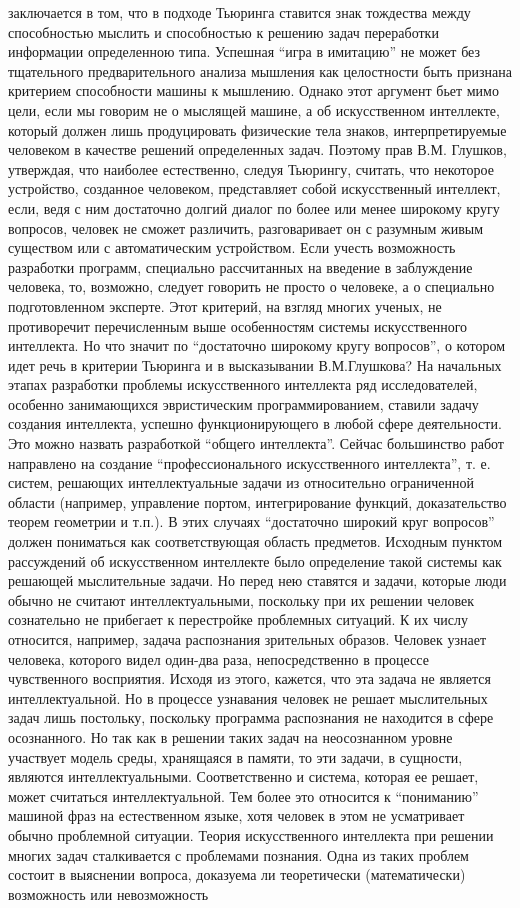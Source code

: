 заключается в том, что в подходе Тьюринга ставится знак тождества между способностью мыслить и способностью к решению задач переработки информации определенною типа. Успешная ``игра в имитацию'' не может без тщательного предварительного анализа мышления как целостности быть признана критерием способности машины к мышлению. Однако этот аргумент бьет мимо цели, если мы говорим не о мыслящей машине, а об искусственном интеллекте, который должен лишь продуцировать физические тела знаков, интерпретируемые человеком в качестве решений определенных задач. Поэтому прав В.М. Глушков, утверждая, что наиболее естественно, следуя Тьюрингу, считать, что некоторое устройство, созданное человеком, представляет собой искусственный интеллект, если, ведя с ним достаточно долгий диалог по более или менее широкому кругу вопросов, человек не сможет различить, разговаривает он с разумным живым существом или с автоматическим устройством. Если учесть возможность разработки программ, специально рассчитанных на введение в заблуждение человека, то, возможно, следует говорить не просто о человеке, а о специально подготовленном эксперте. Этот критерий, на взгляд многих ученых, не противоречит перечисленным выше особенностям системы искусственного интеллекта. Но что значит по ``достаточно широкому кругу вопросов'', о котором идет речь в критерии Тьюринга и в высказывании В.М.Глушкова? На начальных этапах разработки проблемы искусственного интеллекта ряд исследователей, особенно занимающихся эвристическим программированием, ставили задачу создания интеллекта, успешно функционирующего в любой сфере деятельности. Это можно назвать разработкой ``общего интеллекта''. Сейчас большинство работ направлено на создание ``профессионального искусственного интеллекта'', т. е. систем, решающих интеллектуальные задачи из относительно ограниченной области (например, управление портом, интегрирование функций, доказательство теорем геометрии и т.п.). В этих случаях ``достаточно широкий круг вопросов'' должен пониматься как соответствующая область предметов. Исходным пунктом рассуждений об искусственном интеллекте было определение такой системы как решающей мыслительные задачи. Но перед нею ставятся и задачи, которые люди обычно не считают интеллектуальными, поскольку при их решении человек сознательно не прибегает к перестройке проблемных ситуаций. К их числу относится, например, задача распознания зрительных образов. Человек узнает человека, которого видел один-два раза, непосредственно в процессе чувственного восприятия. Исходя из этого, кажется, что эта задача не является интеллектуальной. Но в процессе узнавания человек не решает мыслительных задач лишь постольку, поскольку программа распознания не находится в сфере осознанного. Но так как в решении таких задач на неосознанном уровне участвует модель среды, хранящаяся в памяти, то эти задачи, в сущности, являются интеллектуальными. Соответственно и система, которая ее решает, может считаться интеллектуальной. Тем более это относится к ``пониманию'' машиной фраз на естественном языке, хотя человек в этом не усматривает обычно проблемной ситуации. Теория искусственного интеллекта при решении многих задач сталкивается с проблемами познания. Одна из таких проблем состоит в выяснении вопроса, доказуема ли теоретически (математически) возможность или невозможность 